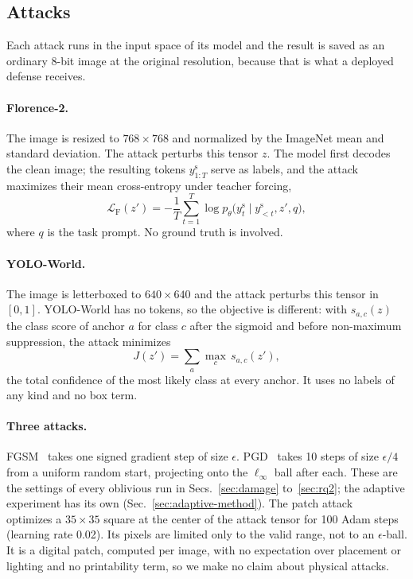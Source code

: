 \documentclass[11pt]{article}
\newcommand{\yw}{YOLO-World}
\newcommand{\fl}{Florence-2}
\newcommand{\linf}{\ell_\infty}
\begin{document}
\subsection{Attacks}
\label{sec:attacks}

Each attack runs in the input space of its model and the result is saved as
an ordinary 8-bit image at the original resolution, because that is what a
deployed defense receives.

\paragraph{\fl{}.} The image is resized to $768\times768$ and normalized by
the ImageNet mean and standard deviation. The attack perturbs this tensor
$z$. The model first decodes the clean image; the resulting tokens
$y^{\mathrm s}_{1:T}$ serve as labels, and the attack maximizes their mean
cross-entropy under teacher forcing,
\begin{equation}
\mathcal{L}_{\mathrm{F}}(z') = -\frac1T\sum_{t=1}^{T}
 \log p_\theta\big(y^{\mathrm s}_t \mid y^{\mathrm s}_{<t}, z', q\big),
\end{equation}
where $q$ is the task prompt. No ground truth is involved.

\paragraph{\yw{}.} The image is letterboxed to $640\times640$ and the attack
perturbs this tensor in $[0,1]$. \yw{} has no tokens, so the objective is
different: with $s_{a,c}(z)$ the class score of anchor $a$ for class $c$
after the sigmoid and before non-maximum suppression, the attack minimizes
\begin{equation}
J(z') = \sum_{a} \max_{c}\, s_{a,c}(z'),
\label{eq:J}
\end{equation}
the total confidence of the most likely class at every anchor. It uses no
labels of any kind and no box term.

\paragraph{Three attacks.} FGSM~\cite{goodfellow2015explaining} takes one
signed gradient step of size $\epsilon$. PGD~\cite{madry2018towards} takes
10 steps of size $\epsilon/4$ from a uniform random start, projecting onto
the $\linf$ ball after each. These are the settings of every oblivious run in
Secs.~\ref{sec:damage} to~\ref{sec:rq2}; the adaptive experiment has its own
(Sec.~\ref{sec:adaptive-method}). The patch attack~\cite{brown2017adversarial}
optimizes a $35\times35$ square at the center of the attack tensor for 100
Adam steps (learning rate 0.02). Its pixels are limited only to the valid
range, not to an $\epsilon$-ball. It is a digital patch, computed per
image, with no expectation over placement or lighting and no printability
term, so we make no claim about physical attacks.
\end{document}
